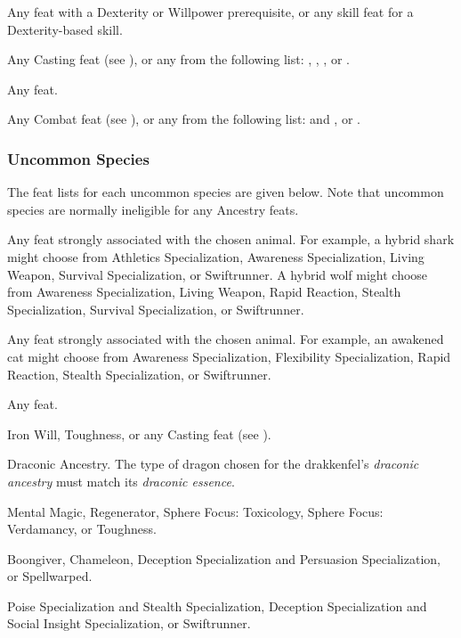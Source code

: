      Any feat with a Dexterity or Willpower prerequisite, or any skill feat for a Dexterity-based skill.

     Any Casting feat (see ), or any from the following list: , , , or .

     Any feat.

     Any Combat feat (see ), or any from the following list:  and , or .

    \subsubsection{Uncommon Species}
      The feat lists for each uncommon species are given below.
      Note that uncommon species are normally ineligible for any Ancestry feats.

       Any feat strongly associated with the chosen animal. For example, a hybrid shark might choose from Athletics Specialization, Awareness Specialization, Living Weapon, Survival Specialization, or Swiftrunner. A hybrid wolf might choose from Awareness Specialization, Living Weapon, Rapid Reaction, Stealth Specialization, Survival Specialization, or Swiftrunner.

       Any feat strongly associated with the chosen animal. For example, an awakened cat might choose from Awareness Specialization, Flexibility Specialization, Rapid Reaction, Stealth Specialization, or Swiftrunner.

       Any feat.

       Iron Will, Toughness, or any Casting feat (see ).

       Draconic Ancestry. The type of dragon chosen for the drakkenfel's \textit{draconic ancestry} must match its \textit{draconic essence}.

       Mental Magic, Regenerator, Sphere Focus: Toxicology, Sphere Focus: Verdamancy, or Toughness.

       Boongiver, Chameleon, Deception Specialization and Persuasion Specialization, or Spellwarped.

       Poise Specialization and Stealth Specialization, Deception Specialization and Social Insight Specialization, or Swiftrunner.

